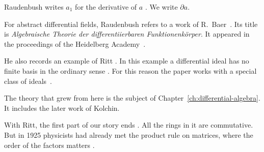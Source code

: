 Raudenbush writes $a_1$ for the derivative of $a$
\cite[p.~361]{Raudenbush1934}. We write $\partial a$.

For abstract differential fields, Raudenbush refers to a work of R.~Baer~\cite[p.~361, footnote]{Raudenbush1934}. Its
title is \emph{Algebraische Theorie der differentiierbaren
Funktionenk\"orper}. It appeared in the proceedings of the Heidelberg
Academy~\cite[p.~361, footnote]{Raudenbush1934}.

He also records an example of Ritt \cite[p.~361]{Raudenbush1934}. In this
example a differential ideal has no finite basis in the ordinary sense
\cite[p.~361]{Raudenbush1934}. For this reason the paper works with a special
class of ideals~\cite[p.~361]{Raudenbush1934}.

The theory that grew from here is the subject of
Chapter~\ref{ch:differential-algebra}. It includes the later work of Kolchin.

With Ritt, the first part of our story ends \cite[p.~361]{Raudenbush1934}. All
the rings in it are commutative. But in 1925 physicists had already met the
product rule on matrices, where the order of the factors matters
\cite[p.~858]{BornJordan1925}.
